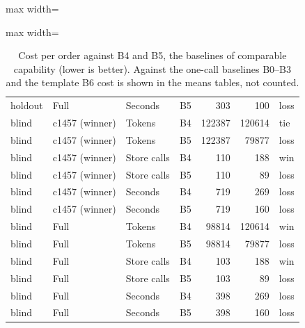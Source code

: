 \begin{table}[!t]
\begin{adjustbox}{max width=\linewidth}
\begin{adjustbox}{max width=\textwidth}
\begin{tabular}{@{}llllrrl@{}}
holdout & Full & Seconds & B5 & 303 & 100 & loss \\
blind & c1457 (winner) & Tokens & B4 & 122387 & 120614 & tie \\
blind & c1457 (winner) & Tokens & B5 & 122387 & 79877 & loss \\
blind & c1457 (winner) & Store calls & B4 & 110 & 188 & win \\
blind & c1457 (winner) & Store calls & B5 & 110 & 89 & loss \\
blind & c1457 (winner) & Seconds & B4 & 719 & 269 & loss \\
blind & c1457 (winner) & Seconds & B5 & 719 & 160 & loss \\
blind & Full & Tokens & B4 & 98814 & 120614 & win \\
blind & Full & Tokens & B5 & 98814 & 79877 & loss \\
blind & Full & Store calls & B4 & 103 & 188 & win \\
blind & Full & Store calls & B5 & 103 & 89 & loss \\
blind & Full & Seconds & B4 & 398 & 269 & loss \\
blind & Full & Seconds & B5 & 398 & 160 & loss \\
\bottomrule
\end{tabular}
\end{adjustbox}
\end{adjustbox}
\caption{Cost per order against B4 and B5, the baselines of comparable capability (lower is better). Against the one-call baselines B0--B3 and the template B6 cost is shown in the means tables, not counted.}
\label{tab:arch_cost}
\end{table}
